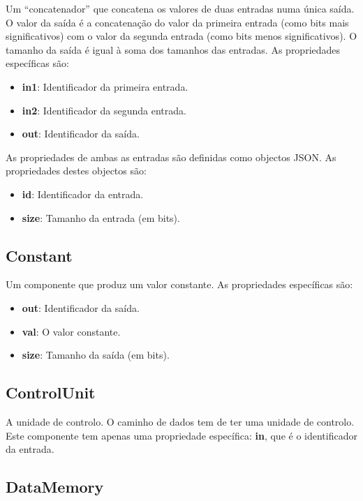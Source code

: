\documentclass[11pt,a4paper,twoside,titlepage]{report}
\begin{document}
Um ``concatenador'' que concatena os valores de duas entradas numa única saída.
O valor da saída é a concatenação do valor da primeira entrada (como bits mais
significativos) com o valor da segunda entrada (como bits menos significativos).
O tamanho da saída é igual à soma dos tamanhos das entradas.
As propriedades específicas são:
\begin{itemize}
	\item \textbf{in1}: Identificador da primeira entrada.
	\item \textbf{in2}: Identificador da segunda entrada.
	\item \textbf{out}: Identificador da saída.
\end{itemize}

As propriedades de ambas as entradas são definidas como objectos JSON. As
propriedades destes objectos são:
\begin{itemize}
	\item \textbf{id}: Identificador da entrada.
	\item \textbf{size}: Tamanho da entrada (em bits).
\end{itemize}

\subsection{Constant}

Um componente que produz um valor constante. As propriedades específicas são:
\begin{itemize}
	\item \textbf{out}: Identificador da saída.
	\item \textbf{val}: O valor constante.
	\item \textbf{size}: Tamanho da saída (em bits).
\end{itemize}

\subsection{ControlUnit}

A unidade de controlo. O caminho de dados tem de ter uma unidade de controlo.
Este componente tem apenas uma propriedade específica: \textbf{in}, que é o
identificador da entrada.

\subsection{DataMemory}
\end{document}
